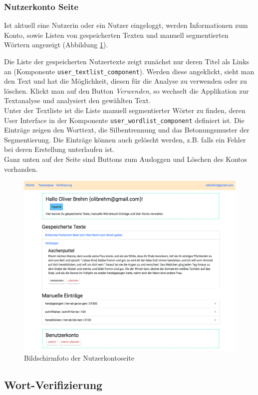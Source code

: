 \subsubsection{Nutzerkonto Seite}

Ist aktuell eine Nutzerin oder ein Nutzer eingeloggt, werden Informationen zum Konto, sowie Listen von gespeicherten Texten und manuell segmentierten Wörtern angezeigt (Abbildung \ref{fig:frontend-useraccount}).

Die Liste der gespeicherten Nutzertexte zeigt zunächst nur deren Titel als Links an (Komponente \texttt{user\_textlist\_component}). Werden diese angeklickt, sieht man den Text und hat die Möglichkeit, diesen für die Analyse zu verwenden oder zu löschen. Klickt man auf den Button \textit{Verwenden}, so wechselt die Applikation zur Textanalyse und analysiert den gewählten Text. \\
Unter der Textliste ist die Liste manuell segmentierter Wörter zu finden, deren User Interface in der Komponente \texttt{user\_wordlist\_component} definiert ist. Die Einträge zeigen den Worttext, die Silbentrennung und das Betonungsmuster der Segmentierung. Die Einträge können auch gelöscht werden, z.B. falls ein Fehler bei deren Erstellung unterlaufen ist.\\
Ganz unten auf der Seite sind Buttons zum Ausloggen und Löschen des Kontos vorhanden.

\begin{figure}[h!]
	\centering
	\includegraphics[width=.8\linewidth, frame]{figures/frontend/user-account}
	\caption{Bildschirmfoto der Nutzerkontoseite}
	\label{fig:frontend-useraccount}
\end{figure}

\subsection{Wort-Verifizierung}

